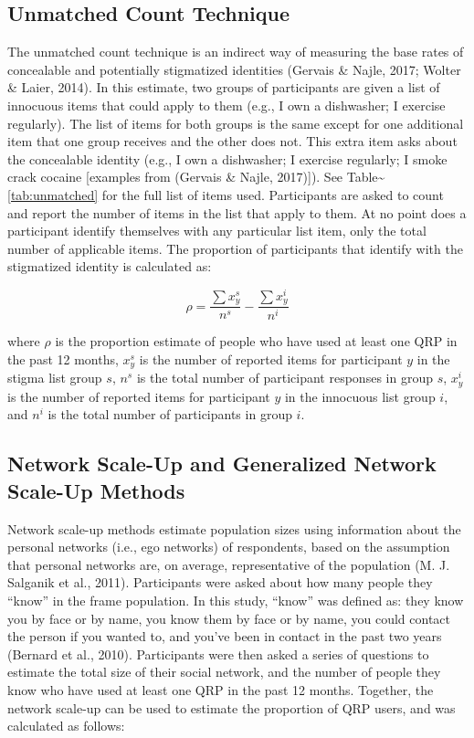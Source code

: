 \documentclass[man]{apa6}
\theoremstyle{definition}
\theoremstyle{definition}
\theoremstyle{definition}
\theoremstyle{remark}
\begin{document}
\subsection{Unmatched Count Technique}\label{unmatched-count-technique}

The unmatched count technique is an indirect way of measuring the base
rates of concealable and potentially stigmatized identities (Gervais \&
Najle, 2017; Wolter \& Laier, 2014). In this estimate, two groups of
participants are given a list of innocuous items that could apply to
them (e.g., I own a dishwasher; I exercise regularly). The list of items
for both groups is the same except for one additional item that one
group receives and the other does not. This extra item asks about the
concealable identity (e.g., I own a dishwasher; I exercise regularly; I
smoke crack cocaine {[}examples from (Gervais \& Najle, 2017){]}). See
Table\textasciitilde{}\ref{tab:unmatched} for the full list of items
used. Participants are asked to count and report the number of items in
the list that apply to them. At no point does a participant identify
themselves with any particular list item, only the total number of
applicable items. The proportion of participants that identify with the
stigmatized identity is calculated as:

\begin{equation}
\rho = \frac{\sum x_y^s}{n^s} - \frac{\sum x_y^i}{n^i}
\end{equation}

where \(\rho\) is the proportion estimate of people who have used at
least one QRP in the past 12 months, \(x_y^s\) is the number of reported
items for participant \(y\) in the stigma list group \(s\), \(n^s\) is
the total number of participant responses in group \(s\), \(x_y^i\) is
the number of reported items for participant \(y\) in the innocuous list
group \(i\), and \(n^i\) is the total number of participants in group
\(i\).

\subsection{Network Scale-Up and Generalized Network Scale-Up
Methods}\label{network-scale-up-and-generalized-network-scale-up-methods}

Network scale-up methods estimate population sizes using information
about the personal networks (i.e., ego networks) of respondents, based
on the assumption that personal networks are, on average, representative
of the population (M. J. Salganik et al., 2011). Participants were asked
about how many people they \enquote{know} in the frame population. In
this study, \enquote{know} was defined as: they know you by face or by
name, you know them by face or by name, you could contact the person if
you wanted to, and you've been in contact in the past two years (Bernard
et al., 2010). Participants were then asked a series of questions to
estimate the total size of their social network, and the number of
people they know who have used at least one QRP in the past 12 months.
Together, the network scale-up can be used to estimate the proportion of
QRP users, and was calculated as follows:
\end{document}
